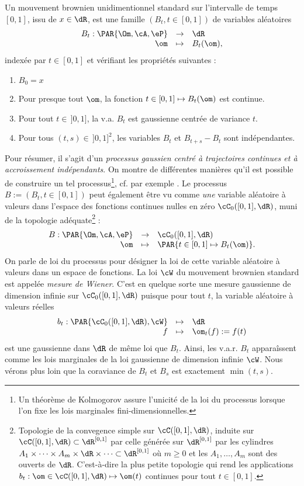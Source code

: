 Un mouvement brownien unidimentionnel standard sur l'intervalle de temps
$[0,1]$, issu de $x\in\dR$, est une famille $(B_t,t\in[0,1])$ de variables
aléatoires
$$
\begin{array}[c]{rcl}
B_t:\PAR{\Om,\cA,\eP}&\to&\dR\\
\om&\mapsto&B_t(\om),
\end{array}
$$
indexée par $t\in[0,1]$ et vérifiant les propriétés suivantes :
\begin{enumerate}
\item $B_0=x$
\item Pour presque tout $\om$, la fonction $t\in[0,1]\mapsto B_t(\om)$ est
  continue.
\item Pour tout $t\in\,]0,1]$, la v.a. $B_t$ est gaussienne centrée de
  variance $t$.
\item Pour tous $(t,s)\in\,]0,1]^2$, les variables $B_t$ et $B_{t+s}-B_t$ sont
  indépendantes.
\end{enumerate}
Pour résumer, il s'agit d'un \emph{processus gaussien centré à trajectoires
  continues et à accroissement indépendants}. On montre de différentes
manières qu'il est possible de construire un tel processus\footnote{Un
  théorème de Kolmogorov assure l'unicité de la loi du processus lorsque l'on
  fixe les lois marginales fini-dimensionnelles.}, cf. par exemple
\cite{karatzas-shreve}. Le processus $B:=(B_t,t\in[0,1])$ peut également être
vu comme \emph{une} variable aléatoire à valeurs dans l'espace des fonctions
continues nulles en zéro $\cC_0([0,1],\dR)$, muni de la topologie
adéquate\footnote{Topologie de la convegence simple sur $\cC([0,1],\dR)$,
  induite sur $\cC([0,1],\dR)\subset\dR^{[0,1]}$ par celle générée sur
  $\dR^{[0,1]}$ par les cylindres $A_1 \times\cdots \times A_m \times \dR \times \cdots \subset
  \dR^{[0,1]}$ où $m\geq 0$ et les $A_1,\ldots,A_m$ sont des ouverts de $\dR$.
  C'est-à-dire la plus petite topologie qui rend les applications
  $b_t:\om\in\cC([0,1],\dR)\mapsto \om(t)$ continues pour tout $t\in[0,1]$.} :
$$
\begin{array}[c]{rcl}
B:\PAR{\Om,\cA,\eP}&\to&\cC_0([0,1],\dR)\\
\om&\mapsto&\PAR{t\in[0,1]\mapsto B_t(\om)}.
\end{array}
$$
On parle de loi du processus pour désigner la loi de cette variable
aléatoire à valeurs dans un espace de fonctions. La loi $\cW$ du mouvement
brownien standard est appelée \emph{mesure de Wiener}. C'est en quelque sorte
une mesure gaussienne de dimension infinie sur $\cC_0([0,1],\dR)$ puisque pour
tout $t$, la variable aléatoire à valeurs réelles
$$
\begin{array}[c]{rcl}
b_t:\PAR{\cC_0([0,1],\dR),\cW}&\mapsto&\dR\\
f&\mapsto& \om_t(f):=f(t)
\end{array}
$$
est une gaussienne dans $\dR$ de même loi que $B_t$.  Ainsi, les v.a.r.
$B_t$ apparaîssent comme les lois marginales de la loi gaussienne de dimension
infinie $\cW$. Nous vérons plus loin que la coraviance de $B_t$ et $B_s$ est
exactement $\min(t,s)$.

